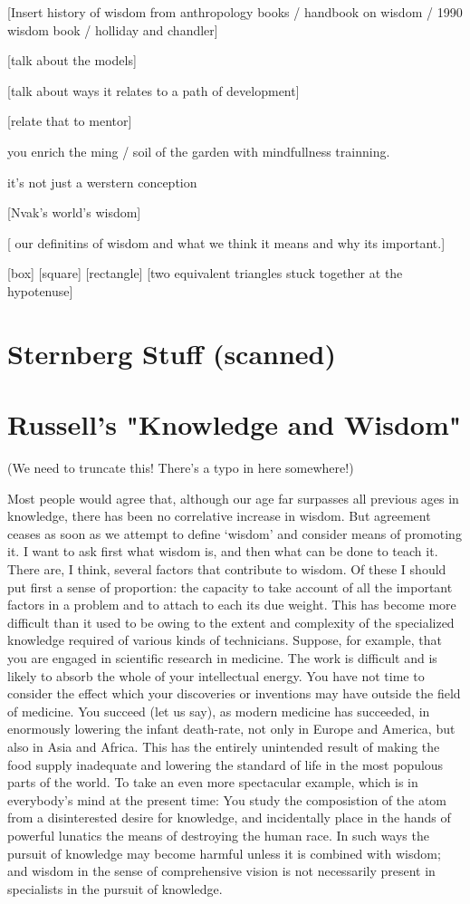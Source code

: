 [Insert history of wisdom from anthropology books / handbook on wisdom / 1990 wisdom book / holliday and chandler]
 
[talk about the models]
 
[talk about ways it relates to a path of development]
 
[relate that to mentor]
 
you enrich the ming / soil of the garden with mindfullness trainning.
 
it's not just a werstern conception
 
[Nvak's world's wisdom]
 
 
[ our definitins of wisdom and what we think it means and why its important.]
 
[box]
[square]
[rectangle]
[two equivalent triangles stuck together at the hypotenuse]

\section{Sternberg Stuff (scanned)}


\section{Russell's "Knowledge and Wisdom"}

(We need to truncate this! There's a typo in here somewhere!)

Most people would agree that, although our age far
surpasses all previous ages in knowledge, there has
been no correlative increase in wisdom. But agreement
ceases as soon as we attempt to define `wisdom' and
consider means of promoting it. I want to ask first
what wisdom is, and then what can be done to teach it.
There are, I think, several factors that contribute to
wisdom. Of these I should put first a sense of
proportion: the capacity to take account of all the
important factors in a problem and to attach to each
its due weight. This has become more difficult than it
used to be owing to the extent and complexity of the
specialized knowledge required of various kinds of
technicians. Suppose, for example, that you are
engaged in scientific research in medicine. The work
is difficult and is likely to absorb the whole of your
intellectual energy. You have not time to consider the
effect which your discoveries or inventions may have
outside the field of medicine. You succeed (let us
say), as modern medicine has succeeded, in enormously
lowering the infant death-rate, not only in Europe and
America, but also in Asia and Africa. This has the
entirely unintended result of making the food supply
inadequate and lowering the standard of life in the
most populous parts of the world. To take an even more
spectacular example, which is in everybody's mind at
the present time: You study the composistion of the
atom from a disinterested desire for knowledge, and
incidentally place in the hands of powerful lunatics
the means of destroying the human race. In such ways
the pursuit of knowledge may become harmful unless it
is combined with wisdom; and wisdom in the sense of
comprehensive vision is not necessarily present in
specialists in the pursuit of knowledge.

